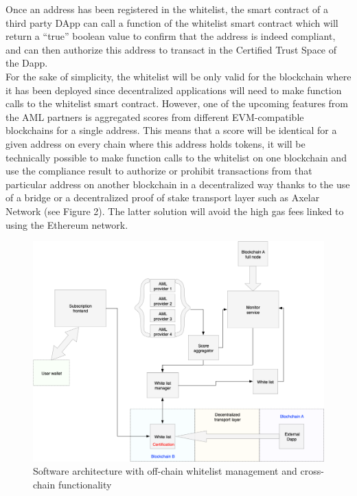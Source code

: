 ﻿\documentclass[a4paper]{article}
\let\OldTexttrademark\texttrademark
\renewcommand{\texttrademark}{\OldTexttrademark\xspace}%
\begin{document}
Once an address has been registered in the whitelist, the smart contract of a third party DApp can call a function of the whitelist smart contract which will return a “true” boolean value to confirm that the address is indeed compliant, and can then authorize this address to transact in the Certified Trust Space\texttrademark of the Dapp. \\

For the sake of simplicity, the whitelist will be only valid for the blockchain where it has been deployed since decentralized applications will need to make function calls to the whitelist smart contract. However, one of the upcoming features from the AML partners is aggregated scores from different EVM-compatible blockchains for a single address. This means that a score will be identical for a given address on every chain where this address holds tokens, it will be technically possible to make function calls to the whitelist on one blockchain and use the compliance result to authorize or prohibit transactions from that particular address on another blockchain in a decentralized way thanks to the use of a bridge or a decentralized proof of stake transport layer such as Axelar Network (see Figure 2). 
The latter solution will avoid the high gas fees linked to using the Ethereum network. \\

\begin{figure}[!h]
\centering
\includegraphics[scale=0.35]{architecture_v1_crosschain_trim.png}
\caption{Software architecture with off-chain whitelist management and cross-chain functionality}
\label{offchain}
\end{figure}  
\end{document}
